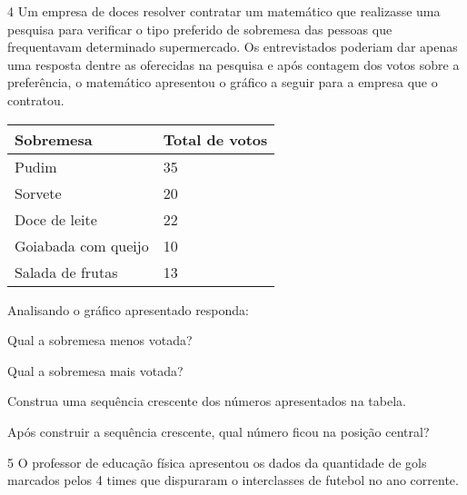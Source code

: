 
\num{4} Um empresa de doces resolver contratar um matemático que realizasse
uma pesquisa para verificar o tipo preferido de sobremesa das pessoas
que frequentavam determinado supermercado. Os entrevistados poderiam dar
apenas uma resposta dentre as oferecidas na pesquisa e após contagem dos
votos sobre a preferência, o matemático apresentou o gráfico a seguir
para a empresa que o contratou.


\begin{longtable}[]{@{}ll@{}}
\toprule
Sobremesa & Total de votos\tabularnewline
\midrule
\endhead
Pudim & 35\tabularnewline
Sorvete & 20\tabularnewline
Doce de leite & 22\tabularnewline
Goiabada com queijo & 10\tabularnewline
Salada de frutas & 13\tabularnewline
\bottomrule
\end{longtable}

Analisando o gráfico apresentado responda:

\begin{escolha}
\item
  Qual a sobremesa menos votada?


\item
  Qual a sobremesa mais votada?


\item
  Construa uma sequência crescente dos números apresentados na tabela.


\item
  Após construir a sequência crescente, qual número ficou na posição
  central?

\end{escolha}


\num{5} O professor de educação física apresentou os dados da quantidade de
gols marcados pelos 4 times que dispuraram o interclasses de futebol no
ano corrente.


